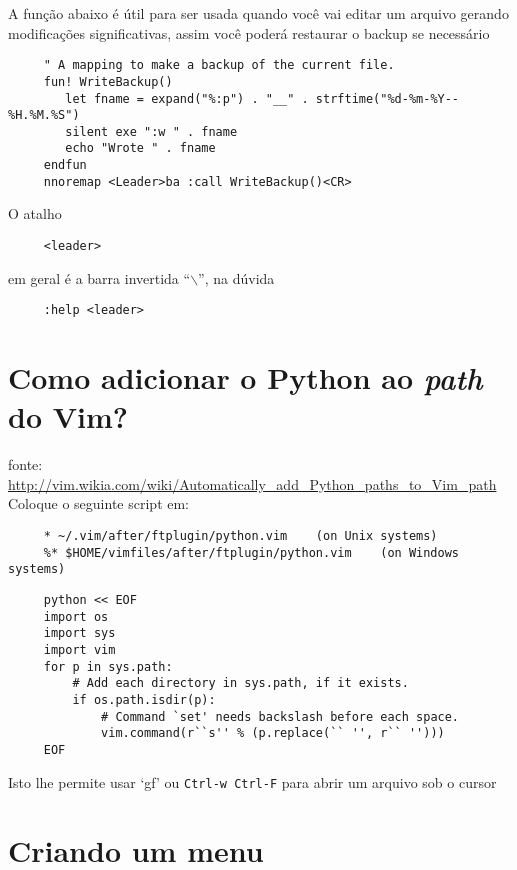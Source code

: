 A função abaixo é útil para ser usada quando você vai editar um arquivo
gerando modificações significativas, assim você poderá restaurar o backup se necessário

\begin{verbatim}
     " A mapping to make a backup of the current file.
     fun! WriteBackup()
        let fname = expand("%:p") . "__" . strftime("%d-%m-%Y--%H.%M.%S")
        silent exe ":w " . fname
        echo "Wrote " . fname
     endfun
     nnoremap <Leader>ba :call WriteBackup()<CR>
\end{verbatim}

O atalho

\begin{verbatim}
     <leader>
\end{verbatim}

em geral é a barra invertida ``$\backslash$'', na dúvida

\begin{verbatim}
     :help <leader>
\end{verbatim}

\section{Como adicionar o Python ao {\em path} do Vim?}
\label{Como adicionar o python ao path do Vim?}

fonte:
\url{http://vim.wikia.com/wiki/Automatically_add_Python_paths_to_Vim_path}
Coloque o seguinte script em:

\begin{verbatim}
     * ~/.vim/after/ftplugin/python.vim    (on Unix systems)
     %* $HOME/vimfiles/after/ftplugin/python.vim    (on Windows systems)
\end{verbatim}

\begin{verbatim}
     python << EOF
     import os
     import sys
     import vim
     for p in sys.path:
         # Add each directory in sys.path, if it exists.
         if os.path.isdir(p):
             # Command `set' needs backslash before each space.
             vim.command(r``s'' % (p.replace(`` '', r`` '')))
     EOF
\end{verbatim}

Isto lhe permite usar `gf' ou {\tt Ctrl-w Ctrl-F} para abrir um arquivo sob o cursor

\section{Criando um menu}
\label{Criando um menu}

